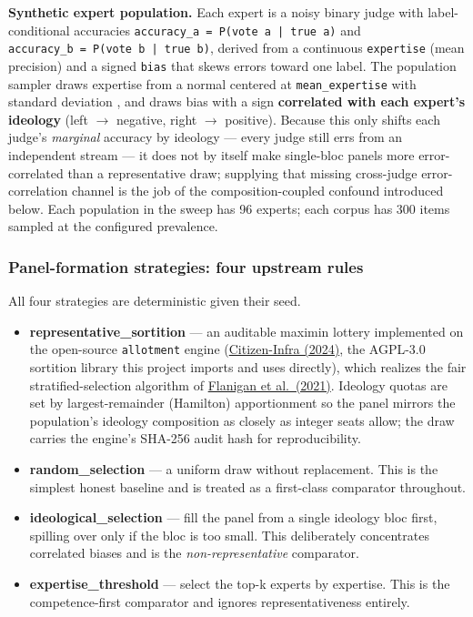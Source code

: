 \documentclass[
]{article}
\providecommand{\tightlist}{%
  \setlength{\itemsep}{0pt}\setlength{\parskip}{0pt}}
\begin{document}
\textbf{Synthetic expert population.} Each expert is a noisy binary
judge with label-conditional accuracies
\texttt{accuracy\_a\ =\ P(vote\ a\ |{}\ true\ a)} and
\texttt{accuracy\_b\ =\ P(vote\ b\ |{}\ true\ b)}, derived from a
continuous \texttt{expertise} (mean precision) and a signed
\texttt{bias} that skews errors toward one label. The population sampler
draws expertise from a normal centered at \texttt{mean\_expertise} with
standard deviation , and draws bias
with a sign \textbf{correlated with each expert's ideology} (left \texorpdfstring{\ensuremath{\to}}{->}
negative, right \texorpdfstring{\ensuremath{\to}}{->} positive). Because this only shifts each judge's
\emph{marginal} accuracy by ideology --- every judge still errs from an
independent stream --- it does not by itself make single-bloc panels
more error-correlated than a representative draw; supplying that missing
cross-judge error-correlation channel is the job of the
composition-coupled confound introduced below. Each population in the
sweep has 96 experts; each corpus has 300 items sampled at the
configured prevalence.

\subsubsection{Panel-formation strategies: four upstream
rules}\label{panel-formation-strategies-four-upstream-rules}

All four strategies are deterministic given their seed.

\begin{itemize}
\tightlist
\item
  \textbf{representative\_sortition} --- an auditable maximin lottery
  implemented on the open-source \texttt{allotment} engine
  (\href{https://github.com/Citizen-Infra/allotment}{Citizen-Infra
  (2024)}, the AGPL-3.0 sortition library this project imports and uses
  directly), which realizes the fair stratified-selection algorithm of
  \href{https://doi.org/10.1038/s41586-021-03788-6}{Flanigan et
  al.~(2021)}. Ideology quotas are set by largest-remainder (Hamilton)
  apportionment so the panel mirrors the population's ideology
  composition as closely as integer seats allow; the draw carries the
  engine's SHA-256 audit hash for reproducibility.
\item
  \textbf{random\_selection} --- a uniform draw without replacement.
  This is the simplest honest baseline and is treated as a first-class
  comparator throughout.
\item
  \textbf{ideological\_selection} --- fill the panel from a single
  ideology bloc first, spilling over only if the bloc is too small. This
  deliberately concentrates correlated biases and is the
  \emph{non-representative} comparator.
\item
  \textbf{expertise\_threshold} --- select the top-k experts by
  expertise. This is the competence-first comparator and ignores
  representativeness entirely.
\end{itemize}
\end{document}
